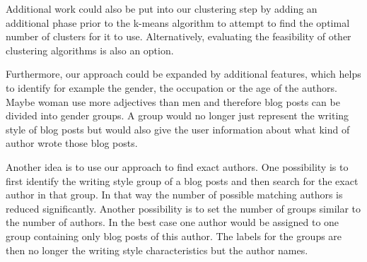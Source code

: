 Additional work could also be put into our clustering step by adding an additional phase prior to the k-means algorithm to attempt to find the optimal number of clusters for it to use.
Alternatively, evaluating the feasibility of other clustering algorithms is also an option.


Furthermore, our approach could be expanded by additional features, which helps to identify for example the gender, the occupation or the age of the authors.
Maybe woman use more adjectives than men and therefore blog posts can be divided into gender groups.
A group would no longer just represent the writing style of blog posts but would also give the user information about what kind of author wrote those blog posts.


Another idea is to use our approach to find exact authors.
One possibility is to first identify the writing style group of a blog posts and then search for the exact author in that group.
In that way the number of possible matching authors is reduced significantly.
Another possibility is to set the number of groups similar to the number of authors.
In the best case one author would be assigned to one group containing only blog posts of this author.
The labels for the groups are then no longer the writing style characteristics but the author names.
